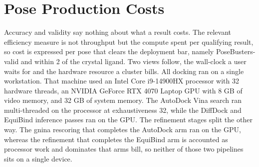 \hypertarget{pose-production-costs}{%
\section{Pose Production Costs}\label{pose-production-costs}}

Accuracy and validity say nothing about what a result costs. The relevant efficiency measure is not throughput but the compute spent per qualifying result, so cost is expressed per pose that clears the deployment bar, namely PoseBusters-valid and within 2 \angstrom{} of the crystal ligand. Two views follow, the wall-clock a user waits for and the hardware resource a cluster bills. All docking ran on a single workstation. That machine used an Intel Core i9-14900HX processor with 32 hardware threads, an NVIDIA GeForce RTX 4070 Laptop GPU with 8 GB of video memory, and 32 GB of system memory. The AutoDock Vina search ran multi-threaded on the processor at exhaustiveness 32, while the DiffDock and EquiBind inference passes ran on the GPU. The refinement stages split the other way. The gnina rescoring that completes the AutoDock arm ran on the GPU, whereas the refinement that completes the EquiBind arm is accounted as processor work and dominates that arm\textquotesingle s bill, so neither of those two pipelines sits on a single device.

